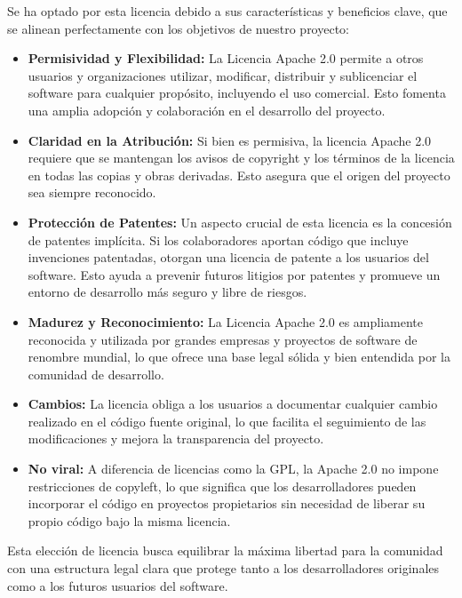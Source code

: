 Se ha optado por esta licencia debido a sus características y beneficios clave, que se alinean perfectamente con los objetivos de nuestro proyecto:

\begin{itemize}
    \item \textbf{Permisividad y Flexibilidad:} La Licencia Apache 2.0 permite a otros usuarios y organizaciones utilizar, modificar, distribuir y sublicenciar el software para cualquier propósito, incluyendo el uso comercial. Esto fomenta una amplia adopción y colaboración en el desarrollo del proyecto.
    \item \textbf{Claridad en la Atribución:} Si bien es permisiva, la licencia Apache 2.0 requiere que se mantengan los avisos de copyright y los términos de la licencia en todas las copias y obras derivadas. Esto asegura que el origen del proyecto sea siempre reconocido.
    \item \textbf{Protección de Patentes:} Un aspecto crucial de esta licencia es la concesión de patentes implícita. Si los colaboradores aportan código que incluye invenciones patentadas, otorgan una licencia de patente a los usuarios del software. Esto ayuda a prevenir futuros litigios por patentes y promueve un entorno de desarrollo más seguro y libre de riesgos.
    \item \textbf{Madurez y Reconocimiento:} La Licencia Apache 2.0 es ampliamente reconocida y utilizada por grandes empresas y proyectos de software de renombre mundial, lo que ofrece una base legal sólida y bien entendida por la comunidad de desarrollo.
    \item \textbf{Cambios:} La licencia obliga a los usuarios a documentar cualquier cambio realizado en el código fuente original, lo que facilita el seguimiento de las modificaciones y mejora la transparencia del proyecto.
    \item \textbf{No viral:} A diferencia de licencias como la GPL, la Apache 2.0 no impone restricciones de copyleft, lo que significa que los desarrolladores pueden incorporar el código en proyectos propietarios sin necesidad de liberar su propio código bajo la misma licencia.
\end{itemize}

Esta elección de licencia busca equilibrar la máxima libertad para la comunidad con una estructura legal clara que protege tanto a los desarrolladores originales como a los futuros usuarios del software.


